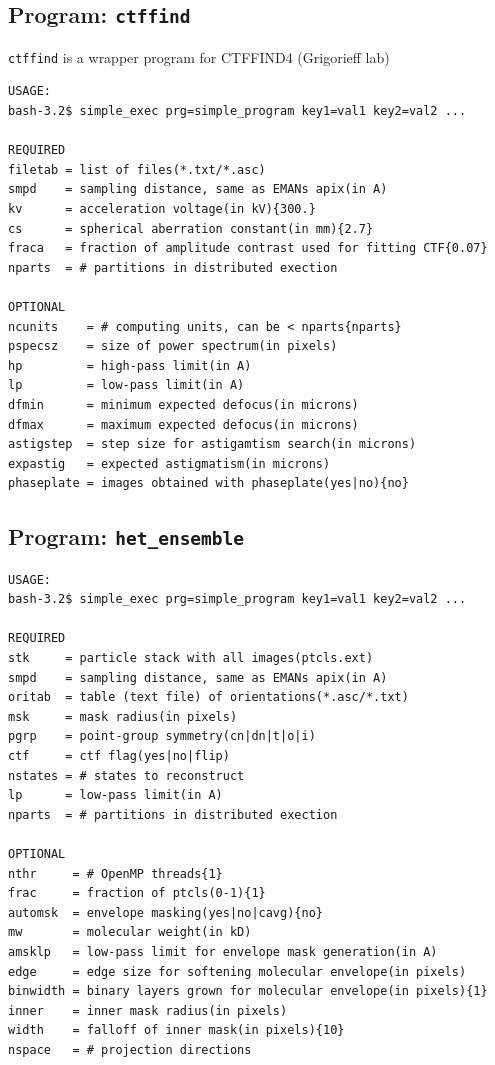 \documentclass[a4paper,11pt]{article}
\newcommand{\prgname}[1]{\textcolor{NavyBlue}{\texttt{#1}}}
\begin{document}
\subsection{Program: \prgname{ctffind}}
\label{ctffind}
\prgname{ctffind} is a wrapper program for CTFFIND4 (Grigorieff lab)

\begin{verbatim}
USAGE:
bash-3.2$ simple_exec prg=simple_program key1=val1 key2=val2 ...

REQUIRED
filetab = list of files(*.txt/*.asc)
smpd    = sampling distance, same as EMANs apix(in A)
kv      = acceleration voltage(in kV){300.}
cs      = spherical aberration constant(in mm){2.7}
fraca   = fraction of amplitude contrast used for fitting CTF{0.07}
nparts  = # partitions in distributed exection

OPTIONAL
ncunits    = # computing units, can be < nparts{nparts}
pspecsz    = size of power spectrum(in pixels)
hp         = high-pass limit(in A)
lp         = low-pass limit(in A)
dfmin      = minimum expected defocus(in microns)
dfmax      = maximum expected defocus(in microns)
astigstep  = step size for astigamtism search(in microns)
expastig   = expected astigmatism(in microns)
phaseplate = images obtained with phaseplate(yes|no){no}
\end{verbatim}

\subsection{Program: \prgname{het\_ensemble}}
\label{het_ensemble}
\begin{verbatim}
USAGE:
bash-3.2$ simple_exec prg=simple_program key1=val1 key2=val2 ...

REQUIRED
stk     = particle stack with all images(ptcls.ext)
smpd    = sampling distance, same as EMANs apix(in A)
oritab  = table (text file) of orientations(*.asc/*.txt)
msk     = mask radius(in pixels)
pgrp    = point-group symmetry(cn|dn|t|o|i)
ctf     = ctf flag(yes|no|flip)
nstates = # states to reconstruct
lp      = low-pass limit(in A)
nparts  = # partitions in distributed exection

OPTIONAL
nthr     = # OpenMP threads{1}
frac     = fraction of ptcls(0-1){1}
automsk  = envelope masking(yes|no|cavg){no}
mw       = molecular weight(in kD)
amsklp   = low-pass limit for envelope mask generation(in A)
edge     = edge size for softening molecular envelope(in pixels)
binwidth = binary layers grown for molecular envelope(in pixels){1}
inner    = inner mask radius(in pixels)
width    = falloff of inner mask(in pixels){10}
nspace   = # projection directions
\end{verbatim}
\end{document}
